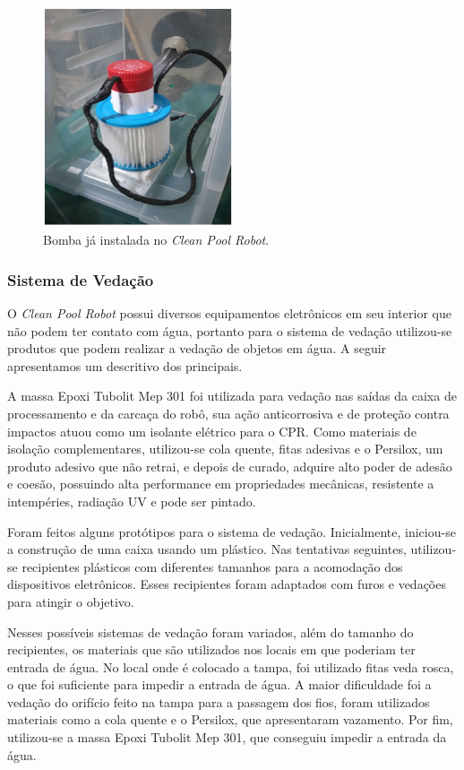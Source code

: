 \begin{figure}[h]
  \centering
  \includegraphics[width=0.5\textwidth]{figuras/bomb-real.png}
  \caption{Bomba já instalada no \textit{Clean Pool Robot}.}
  \label{fig:bomb-real}
\end{figure}
\FloatBarrier

\subsubsection{Sistema de Vedação}
O \textit{Clean Pool Robot} possui diversos equipamentos eletrônicos em seu interior que não podem ter contato com água, portanto para o sistema de vedação utilizou-se produtos que podem realizar a vedação de objetos em água. A seguir apresentamos um descritivo dos principais.

A massa Epoxi Tubolit Mep 301 foi utilizada para vedação nas saídas da caixa de processamento e da carcaça do robô, sua ação anticorrosiva e de proteção contra impactos atuou como um isolante elétrico para o CPR. Como materiais de isolação complementares, utilizou-se cola quente, fitas adesivas e o Persilox, um produto adesivo que não retrai, e depois de curado, adquire alto poder de adesão e coesão, possuindo alta performance em propriedades mecânicas, resistente a intempéries, radiação \textsf{UV} e pode ser pintado.

Foram feitos alguns protótipos para o sistema de vedação. Inicialmente, iniciou-se a construção de uma caixa usando um plástico. Nas tentativas seguintes, utilizou-se recipientes plásticos com diferentes tamanhos para a acomodação dos dispositivos eletrônicos. Esses recipientes foram adaptados com furos e vedações para atingir o objetivo. 

Nesses possíveis sistemas de vedação foram variados, além do tamanho do recipientes, os materiais que são utilizados nos locais em que poderiam ter entrada de água. No local onde é colocado a tampa, foi utilizado fitas veda rosca, o que foi suficiente para impedir a entrada de água. A maior dificuldade foi a vedação do orifício feito na tampa para a passagem dos fios, foram utilizados materiais como a cola quente e o Persilox, que apresentaram vazamento. Por fim, utilizou-se a massa Epoxi Tubolit Mep 301, que conseguiu impedir a entrada da água.

